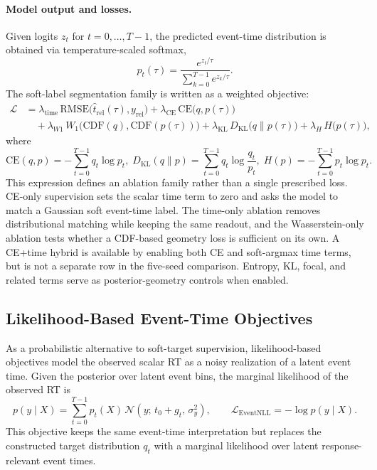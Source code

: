 \documentclass[12pt]{article}
\begin{document}
\paragraph{Model output and losses.}
Given logits $z_t$ for $t=0,\dots,T-1$, the predicted event-time distribution is obtained via temperature-scaled softmax,
\begin{equation}
\label{eq:rt_pred_dist}
p_t(\tau)=\frac{e^{z_t/\tau}}{\sum_{k=0}^{T-1} e^{z_k/\tau}}.
\end{equation}
The soft-label segmentation family is written as a weighted objective:
\begin{equation}
\label{eq:rt_loss}
\begin{aligned}
\mathcal{L}
&= \lambda_{\text{time}}\,\mathrm{RMSE}\big(\hat t_{\mathrm{rel}}(\tau), y_{\mathrm{rel}}\big)
 + \lambda_{\text{CE}}\,\mathrm{CE}\big(q, p(\tau)\big) \\
&\quad + \lambda_{W1}\,W_1\big(\mathrm{CDF}(q), \mathrm{CDF}(p(\tau))\big)
 + \lambda_{\text{KL}}\,D_{\mathrm{KL}}\big(q\|p(\tau)\big)
 + \lambda_{H}\,H\big(p(\tau)\big),
\end{aligned}
\end{equation}
where  
\begin{equation*}
\mathrm{CE}(q,p)=-\sum_{t=0}^{T-1} q_t \log p_t, \;
D_{\mathrm{KL}}(q\|p)=\sum_{t=0}^{T-1} q_t \log\frac{q_t}{p_t}, \;
H(p)=-\sum_{t=0}^{T-1} p_t \log p_t.
\end{equation*}
This expression defines an ablation family rather than a single prescribed loss. CE-only supervision sets the scalar time term to zero and asks the model to match a Gaussian soft event-time label. The time-only ablation removes distributional matching while keeping the same readout, and the Wasserstein-only ablation tests whether a CDF-based geometry loss is sufficient on its own. A CE+time hybrid is available by enabling both CE and soft-argmax time terms, but is not a separate row in the five-seed comparison. Entropy, KL, focal, and related terms serve as posterior-geometry controls when enabled.

\subsection{Likelihood-Based Event-Time Objectives}
\label{sec:event_nll}

As a probabilistic alternative to soft-target supervision, likelihood-based objectives model the observed scalar RT as a noisy realization of a latent event time. Given the posterior over latent event bins, the marginal likelihood of the observed RT is
\begin{equation}
\label{eq:event_nll}
p(y\mid X)
= \sum_{t=0}^{T-1} p_t(X)\,
\mathcal{N}\!\left(y;\,t_0 + g_t,\,\sigma_y^2\right),
\qquad
\mathcal{L}_{\mathrm{EventNLL}} = -\log p(y\mid X).
\end{equation}
This objective keeps the same event-time interpretation but replaces the constructed target distribution $q_t$ with a marginal likelihood over latent response-relevant event times.
\end{document}
